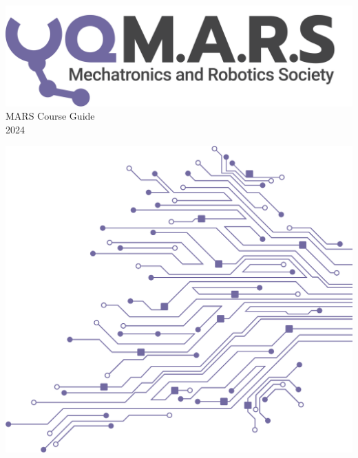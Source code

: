 \documentclass[a4paper,12pt]{report}
\begin{document}
\begin{titlepage}
    \begin{center}
        \vspace*{15mm}
        \includegraphics[width=0.7\paperwidth]{./Assets/Logo (Dark).png} \\
        \vspace{1cm}
        \Huge MARS Course Guide \\
        \huge \textcolor{turbo_purple}{2024}
    \end{center}
    \vfill
    \includegraphics[height=0.5\paperheight, right]{./Assets/Pattern - PCB (Solid).png}
    \vspace*{10mm}
\end{titlepage}
\restoregeometry
\newpage
\tableofcontents













%


\end{document}
